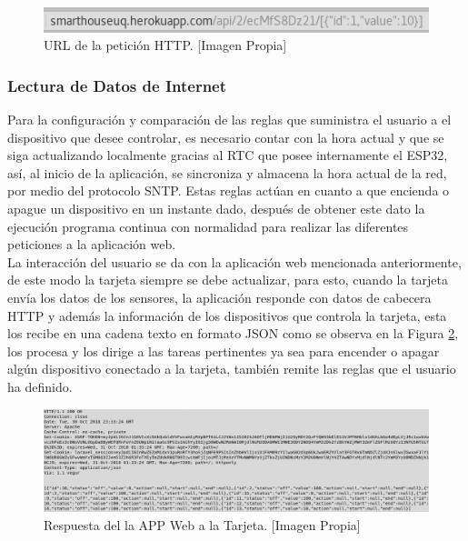 \begin{figure}[!t]
	\centering
	\caption[URL de la petición HTTP.]{URL de la petición HTTP. [Imagen Propia]}
	\label{fig:json}
	\includegraphics[width=0.7\linewidth]{Imagenes/JSON}
\end{figure}


\subsubsection*{Lectura de Datos de Internet}

Para la configuración y comparación de las reglas que suministra el usuario a el dispositivo que desee controlar, es necesario contar con la hora actual y que se siga actualizando localmente gracias al RTC que posee internamente el ESP32, así, al inicio de la aplicación, se sincroniza y almacena la hora actual de la red, por medio del protocolo SNTP. Estas reglas actúan en cuanto a que encienda o apague un dispositivo en un instante dado, después de obtener este dato la ejecución programa continua con normalidad para realizar las diferentes peticiones a la aplicación web.\\

La interacción del usuario se da con la aplicación web mencionada anteriormente, de este modo la tarjeta siempre se debe actualizar, para esto, cuando la tarjeta envía los datos de los sensores, la aplicación responde con datos de cabecera HTTP y además la información de los dispositivos que controla la tarjeta, esta los recibe en una cadena texto en formato JSON como se observa en la Figura \ref{fig:httprqstesp}, los procesa y los dirige a las tareas pertinentes ya sea para encender o apagar algún dispositivo conectado a la tarjeta, también remite las reglas que el usuario ha definido.\\

\begin{figure}[!t]
	\centering
	\caption[Respuesta del la APP Web a la Tarjeta.]{Respuesta del la APP Web a la Tarjeta.  [Imagen Propia]}
	\label{fig:httprqstesp}
	\includegraphics[width=0.8\linewidth]{Imagenes/HTTPRqstesp}
\end{figure}

